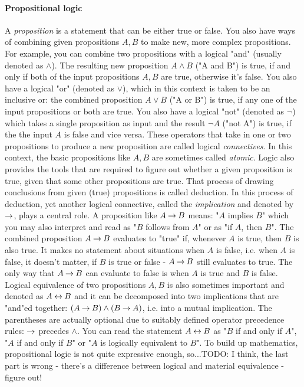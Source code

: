 \paragraph{Propositional logic} A \emph{proposition} is a statement that can be either true or false. You also have ways of combining given propositions $A,B$ to make new, more complex propositions. For example, you can combine two propositions with a logical "and" (usually denoted as $\wedge$). The resulting new proposition $A \wedge B$ ("A and B") is true, if and only if both of the input propositions $A,B$ are true, otherwise it's false. You also have a logical "or" (denoted as $\vee$), which in this context is taken to be an inclusive or: the combined proposition $A \vee B$ ("A or B") is true, if any one of the input propositions or both are true. You also have a logical "not" (denoted as $\neg$) which takes a single proposition as input and the result $\neg A$ ("not A") is true, if the the input $A$ is false and vice versa. These operators that take in one or two propositions to produce a new proposition are called logical \emph{connectives}. In this context, the basic propositions like $A,B$ are sometimes called \emph{atomic}. Logic also provides the tools that are required to figure out whether a given proposition is true, given that some other propositions are true. That process of drawing conclusions from given (true) propositions is called deduction. In this process of deduction, yet another logical connective, called the \emph{implication} and denoted by $\mathbin{\rightarrow}$, plays a central role. A proposition like $A \mathbin{\rightarrow} B$ means: "$A$ implies $B$" which you may also interpret and read as "$B$ follows from $A$" or as "if $A$, then $B$". The combined proposition $A \mathbin{\rightarrow} B$ evaluates to "true" if, whenever $A$ is true, then $B$ is also true. It makes no statement about situations when $A$ is false, i.e. when $A$ is false, it doesn't matter, if $B$ is true or false - $A \mathbin{\rightarrow} B$ still evaluates to true. The only way that $A \mathbin{\rightarrow} B$ can evaluate to false is when $A$ is true and $B$ is false. Logical equivalence of two propositions $A,B$ is also sometimes important and denoted as $A \mathbin{\leftrightarrow} B$ and it can be decomposed into two implications that are "and"ed together: $(A \mathbin{\rightarrow} B) \wedge (B \mathbin{\rightarrow} A)$, i.e. into a mutual implication. The parentheses are actually optional due to suitably defined operator precedence rules: $\mathbin{\rightarrow}$ precedes $\wedge$. You can read the statement $A \mathbin{\leftrightarrow} B$ as "$B$ if and only if $A$", "$A$ if and only if $B$" or "$A$ is logically equivalent to $B$". To build up mathematics, propositional logic is not quite expressive enough, so...TODO: I think, the last part is wrong - there's a difference between logical and material equivalence - figure out!

